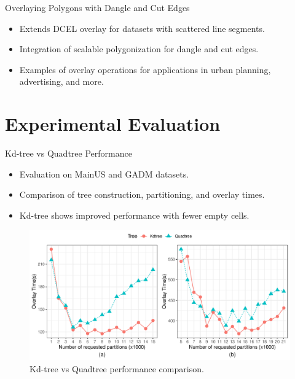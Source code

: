 \documentclass{beamer}
\begin{document}
\begin{frame}{Overlaying Polygons with Dangle and Cut Edges}
    \begin{itemize}
        \item Extends DCEL overlay for datasets with scattered line segments.
        \item Integration of scalable polygonization for dangle and cut edges.
        \item Examples of overlay operations for applications in urban planning, advertising, and more.
    \end{itemize}
\end{frame}

\section{Experimental Evaluation}
\begin{frame}{Kd-tree vs Quadtree Performance}
    \begin{itemize}
        \item Evaluation on MainUS and GADM datasets.
        \item Comparison of tree construction, partitioning, and overlay times.
        \item Kd-tree shows improved performance with fewer empty cells.
    \end{itemize}
    \begin{figure}
        \includegraphics[width=0.8\linewidth]{chapterExtension/K/K_Overlay} %
        \caption{Kd-tree vs Quadtree performance comparison.}
    \end{figure}
\end{frame}
\end{document}
